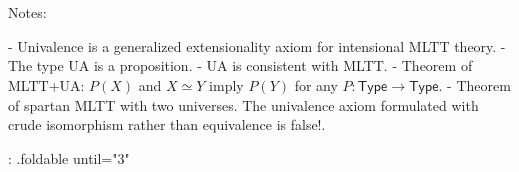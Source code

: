 \begin{code}%
%
\>[2]\<%
\\
\>[2][@{}l@{\AgdaIndent{0}}]%
\>[4]\AgdaSymbol{:}\AgdaSpace{}%
\AgdaSpace{}%
\AgdaSymbol{\{}\AgdaSymbol{\}}\<%
\\
%
\>[4]\AgdaSpace{}%
\AgdaSymbol{(}\AgdaSpace{}%
\AgdaSymbol{(}\AgdaSpace{}%
\AgdaSymbol{))}\<%
\\
\>[0]\<%
\\
%
\>[2]\AgdaSpace{}%
\AgdaSymbol{\{}\AgdaSpace{}%
\AgdaSymbol{=}\AgdaSpace{}%
\AgdaSymbol{\}}%
\>[14]\AgdaSymbol{=}\<%
\\
\>[2][@{}l@{\AgdaIndent{0}}]%
\>[4]\AgdaSymbol{(}\AgdaSpace{}%
\AgdaSymbol{:}\AgdaSpace{}%
\AgdaSpace{}%
\AgdaSymbol{)}\<%
\\
%
\>[4]\AgdaSpace{}%
\AgdaSpace{}%
\AgdaSymbol{(}\AgdaSpace{}%
\AgdaSpace{}%
\AgdaSymbol{(}\AgdaSpace{}%
\AgdaSymbol{)}\AgdaSpace{}%
\AgdaSpace{}%
\AgdaSpace{}%
\AgdaSpace{}%
\AgdaSymbol{(}\AgdaSpace{}%
\AgdaSpace{}%
\AgdaSymbol{)}\AgdaSpace{}%
\AgdaSymbol{))}\<%
\\
%
\>[4]\AgdaSpace{}%
\AgdaSpace{}%
%
\>[23]\<%
\end{code}

Notes:

  - Univalence is a generalized extensionality axiom for intensional MLTT theory.
  - The type UA is a proposition.
  - UA is consistent with MLTT.
  - Theorem of MLTT+UA: $P(X)$ and $X≃Y$ imply $P(Y)$ for any $P : \mathsf{Type} → \mathsf{Type}$.
  - Theorem of spartan MLTT with two universes. The univalence axiom formulated
with crude isomorphism rather than equivalence is false!.

{: .foldable until="3" }
\begin{code}%
%
\>[2]\<%
\\
\>[2][@{}l@{\AgdaIndent{0}}]%
\>[4]\AgdaSymbol{:}\AgdaSpace{}%
\AgdaSymbol{(}\AgdaSpace{}%
\AgdaOperator{\AgdaDatatype{==}}\AgdaSpace{}%
\AgdaSymbol{)}\AgdaSpace{}%
\AgdaSpace{}%
\AgdaSymbol{(}\AgdaSpace{}%
\AgdaSpace{}%
\AgdaSymbol{)}\<%
\\
%
\\[\AgdaEmptyExtraSkip]%
%
\>[2]\AgdaSpace{}%
\AgdaSymbol{=}\AgdaSpace{}%
\AgdaSpace{}%
\AgdaOperator{\AgdaInductiveConstructor{,}}\AgdaSpace{}%
\<%
\end{code}

